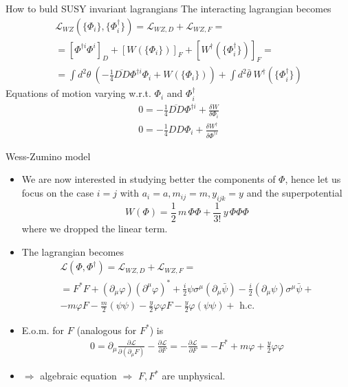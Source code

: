 \documentclass[10pt]{beamer}
\begin{document}
\begin{frame}{How to buld SUSY invariant lagrangians}
The interacting lagrangian becomes
\begin{gather*}
\mathcal{L}_{WZ}\left(\{\Phi_i\}, \{\Phi^{\dagger}_i\}\right) = \mathcal{L}_{WZ,D} + \mathcal{L}_{WZ,F} = \\
= \left[\Phi^{\dagger i}\Phi^i\right]_D + \left[W(\{\Phi_i\})\right]_F +  \left[W^{\dagger}(\{\Phi^{\dagger}_i\})\right]_F = \\
= \int d^2\theta \ \left(-\frac{1}{4}\overline{DD}\Phi^{\dagger i}\Phi_i + W(\{\Phi_i\})\right) + \int d^2\bar\theta \ W^{\dagger}(\{\Phi^{\dagger}_i\})
\end{gather*}
Equations of motion varying w.r.t. $\Phi_i$ and $\Phi_i^{\dagger}$
\begin{gather*}
    0=-\frac{1}{4} \overline{D D} \Phi^{\dagger i}+\frac{\delta W}{\delta \Phi_{i}} \\
    0=-\frac{1}{4} D D \Phi_{i}+\frac{\delta W^{\dagger}}{\delta \Phi^{\dagger i}}
\end{gather*}
\end{frame}

\begin{frame}{Wess-Zumino model}
    \begin{itemize}
        \item We are now interested in studying better the components of $\Phi$, hence let us focus on the case $i=j$ with $a_{i} = a, m_{ij}=m, y_{ijk}=y$ and the superpotential
            \begin{equation*}
                W(\Phi) = \frac{1}{2} \, m \, \Phi\Phi + \frac{1}{3!} \,  y \, \Phi \Phi \Phi
            \end{equation*}
            where we dropped the linear term.
        \item The lagrangian becomes
            \begin{gather*}
                \mathcal{L}(\Phi, \Phi^{\dagger}) = \mathcal{L}_{WZ, D} + \mathcal{L}_{WZ, F} = \\ 
                = F^{*} F+\left(\partial_{\mu} \varphi\right)\left(\partial^{\mu} \varphi\right)^{*}+\frac{i}{2} \psi \sigma^{\mu}\left(\partial_{\mu} \bar{\psi}\right)-\frac{i}{2}\left(\partial_{\mu} \psi\right) \sigma^{\mu} \bar\psi + \\
                    -m \varphi F-\frac{m}{2}(\psi \psi)-\frac{y}{2} \varphi \varphi F-\frac{y}{2} \varphi(\psi \psi)+\text { h.c. }
            \end{gather*}
        \item E.o.m. for $F$ (analogous for $F^{*}$) is
            \begin{gather*}
                0=\partial_{\mu} \frac{\partial \mathcal{L}}{\partial\left(\partial_{\mu} F\right)}-\frac{\partial \mathcal{L}}{\partial F}=-\frac{\partial \mathcal{L}}{\partial F}=-F^{*}+m \varphi+\frac{y}{2} \varphi \varphi
            \end{gather*}
        \item $\Rightarrow$ algebraic equation $\Rightarrow$ $F,F^{*}$ are unphysical. 
    \end{itemize}
\end{frame}
\end{document}
